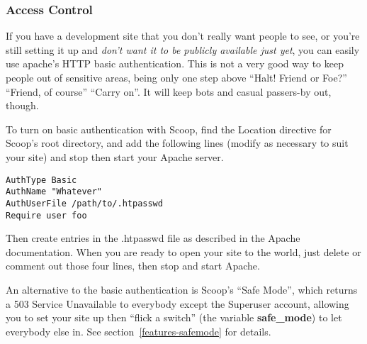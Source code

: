 \subsubsection{Access Control}

If you have a development site that you don't really want people to see, or you're still setting it up and {\em don't want it to be publicly available just yet}, you can easily use apache's HTTP basic authentication.  This is not a very good way to keep people out of sensitive areas, being only one step above ``Halt! Friend or Foe?'' ``Friend, of course'' ``Carry on''.  It will keep bots and casual passers-by out, though.

To turn on basic authentication with Scoop, find the Location directive for Scoop's root directory, and add the following lines (modify as necessary to suit your site) and stop then start your Apache server.

\begin{verbatim}
AuthType Basic
AuthName "Whatever"
AuthUserFile /path/to/.htpasswd
Require user foo
\end{verbatim}

Then create entries in the .htpasswd file as described in the Apache documentation.  When you are ready to open your site to the world, just delete or comment out those four lines, then stop and start Apache.

An alternative to the basic authentication is Scoop's ``Safe Mode'', which returns a 503 Service Unavailable to everybody except the Superuser account, allowing you to set your site up then ``flick a switch'' (the variable {\bf safe\_mode}) to let everybody else in. See section~\ref{features-safemode} for details.

